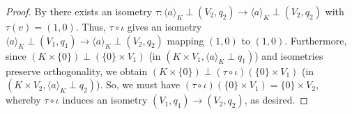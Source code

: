 \documentclass[12pt, leqno, british]{amsart}
\begin{document}
\begin{proof}
By  there exists an isometry $\tau : \langle a \rangle_K \perp (V_2, q_2) \to \langle a \rangle_K \perp (V_2, q_2)$ with $\tau(v) = (1, 0)$.
Thus, $\tau \circ \iota$ gives an isometry $\langle a \rangle_K \perp (V_1, q_1) \to \langle a \rangle_K \perp (V_2, q_2)$ mapping $(1, 0)$ to $(1, 0)$.
Furthermore, since $(K \times \lbrace 0 \rbrace) \perp (\lbrace 0 \rbrace \times V_1)$ (in $(K \times V_1, \langle a \rangle_K \perp q_1)$) and isometries preserve orthogonality, we obtain $(K \times \lbrace 0 \rbrace) \perp (\tau \circ \iota)(\lbrace 0 \rbrace \times V_1)$ (in $(K \times V_2, \langle a \rangle_K \perp q_2)$).
So, we must have $(\tau \circ \iota)(\lbrace 0 \rbrace \times V_1) = \lbrace 0 \rbrace \times V_2$, whereby $\tau \circ \iota$ induces an isometry $(V_1, q_1) \to (V_2, q_2)$, as desired.
\end{proof}
\end{document}

